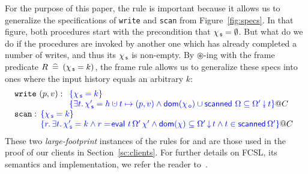 For the purpose of this paper, the rule is important because it allows
us to generalize the specifications of {\tt write} and {\tt scan} from
Figure~\ref{fig:specs}. In that figure, both procedures start with the
precondition that $\chi_{\, \mathsf{s}} = \emptyset$. But what do we do if the
procedures are invoked by another one which has already completed a
number of writes, and thus its $\chi_{\, \mathsf{s}}$ is non-empty. By
$\circledast$-ing with the frame predicate $R \mathrel{\:\widehat{=}\:} (\chi_{\, \mathsf{s}} = k)$,
the frame rule allows us to generalize these specs into ones where the
input history equals an arbitrary $k$:
%
\[
\begin{array}{l}
\mathtt{write}\ (p, v) : %
\begin{array}[t]{l}
\tsPre{\{\histS = k\}}\\
\tsPos{\{\exists t\ldot \histS' = h \hunion t \mapsto (p, v) \wedge
    \dom {\histO} \cup \scanned\, \stableorder
       \subseteq \sideal{\stableorderP}{t}\}} @ C %
\end{array}\\[5pt]
%
\mathtt{scan} : 
\!\!\begin{array}[t]{l}
\tsPre{\{\histS = k\}}\\
\tsPos{\{r\ldot \exists t\ldot \histSP = k \wedge
   r =\! \eval\ t\, {\stableorderP}\, {\histP} \wedge
  \dom{\hist} \subseteq \ideal{\stableorderP}{t} \wedge
  t \in \scanned{\stableorderP}\}} @ C %
\end{array}
\end{array}
\]
%
These two {\it large-footprint} instances of the rules for {\jyscan}
and {\jywrite} are those used in the proof of our clients in
Section~\ref{sc:clients}. For further details on FCSL, its semantics
and implementation, we refer the reader to~\cite{NanevskiLSD+ESOP14}.


